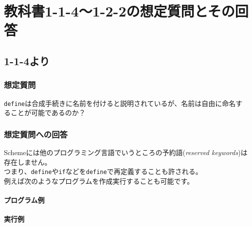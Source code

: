 \documentclass[a4paper,12pt]{article}
\begin{document}
\section{教科書1-1-4〜1-2-2の想定質問とその回答}

\subsection{1-1-4より}

\subsubsection{想定質問}

{\tt define}は合成手続きに名前を付けると説明されているが、名前は自由に命名することが可能であるのか？

\subsubsection{想定質問への回答}

Schemeには他のプログラミング言語でいうところの予約語({\em reserved keywords})は存在しません。\\
つまり、{\tt define}や{\tt if}などを{\tt define}で再定義することも許される。\\
例えば次のようなプログラムを作成実行することも可能です。\\
\\
{\bf プログラム例} \\
\\
{\bf 実行例}
\\
\end{document}
